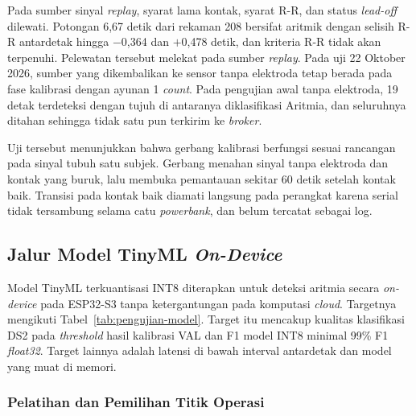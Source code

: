 Pada sumber sinyal \textit{replay}, syarat lama kontak, syarat R-R, dan status \textit{lead-off} dilewati. Potongan 6,67 detik dari rekaman 208 bersifat aritmik dengan selisih R-R antardetak hingga $-$0,364 dan $+$0,478 detik, dan kriteria R-R tidak akan terpenuhi. Pelewatan tersebut melekat pada sumber \textit{replay}. Pada uji 22 Oktober 2026, sumber yang dikembalikan ke sensor tanpa elektroda tetap berada pada fase kalibrasi dengan ayunan 1 \textit{count}. Pada pengujian awal tanpa elektroda, 19 detak terdeteksi dengan tujuh di antaranya diklasifikasi Aritmia, dan seluruhnya ditahan sehingga tidak satu pun terkirim ke \textit{broker}.

Uji tersebut menunjukkan bahwa gerbang kalibrasi berfungsi sesuai rancangan pada sinyal tubuh satu subjek. Gerbang menahan sinyal tanpa elektroda dan kontak yang buruk, lalu membuka pemantauan sekitar 60 detik setelah kontak baik. Transisi pada kontak baik diamati langsung pada perangkat karena serial tidak tersambung selama catu \textit{powerbank}, dan belum tercatat sebagai log.

\subsection{Jalur Model TinyML \textit{On-Device}}

Model TinyML terkuantisasi INT8 diterapkan untuk deteksi aritmia secara \textit{on-device} pada ESP32-S3 tanpa ketergantungan pada komputasi \textit{cloud}. Targetnya mengikuti Tabel~\ref{tab:pengujian-model}. Target itu mencakup kualitas klasifikasi DS2 pada \textit{threshold} hasil kalibrasi VAL dan F1 model INT8 minimal 99\% F1 \textit{float32}. Target lainnya adalah latensi di bawah interval antardetak dan model yang muat di memori.

\subsubsection{Pelatihan dan Pemilihan Titik Operasi}

